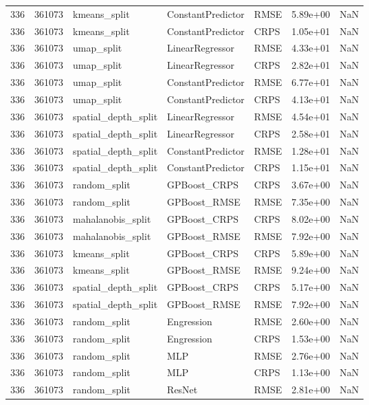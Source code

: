 \begin{tabular}{rrlllrr}
336 & 361073 & kmeans\_split & ConstantPredictor & RMSE & 5.89e+00 & NaN \\
336 & 361073 & kmeans\_split & ConstantPredictor & CRPS & 1.05e+01 & NaN \\
336 & 361073 & umap\_split & LinearRegressor & RMSE & 4.33e+01 & NaN \\
336 & 361073 & umap\_split & LinearRegressor & CRPS & 2.82e+01 & NaN \\
336 & 361073 & umap\_split & ConstantPredictor & RMSE & 6.77e+01 & NaN \\
336 & 361073 & umap\_split & ConstantPredictor & CRPS & 4.13e+01 & NaN \\
336 & 361073 & spatial\_depth\_split & LinearRegressor & RMSE & 4.54e+01 & NaN \\
336 & 361073 & spatial\_depth\_split & LinearRegressor & CRPS & 2.58e+01 & NaN \\
336 & 361073 & spatial\_depth\_split & ConstantPredictor & RMSE & 1.28e+01 & NaN \\
336 & 361073 & spatial\_depth\_split & ConstantPredictor & CRPS & 1.15e+01 & NaN \\
336 & 361073 & random\_split & GPBoost\_CRPS & CRPS & 3.67e+00 & NaN \\
336 & 361073 & random\_split & GPBoost\_RMSE & RMSE & 7.35e+00 & NaN \\
336 & 361073 & mahalanobis\_split & GPBoost\_CRPS & CRPS & 8.02e+00 & NaN \\
336 & 361073 & mahalanobis\_split & GPBoost\_RMSE & RMSE & 7.92e+00 & NaN \\
336 & 361073 & kmeans\_split & GPBoost\_CRPS & CRPS & 5.89e+00 & NaN \\
336 & 361073 & kmeans\_split & GPBoost\_RMSE & RMSE & 9.24e+00 & NaN \\
336 & 361073 & spatial\_depth\_split & GPBoost\_CRPS & CRPS & 5.17e+00 & NaN \\
336 & 361073 & spatial\_depth\_split & GPBoost\_RMSE & RMSE & 7.92e+00 & NaN \\
336 & 361073 & random\_split & Engression & RMSE & 2.60e+00 & NaN \\
336 & 361073 & random\_split & Engression & CRPS & 1.53e+00 & NaN \\
336 & 361073 & random\_split & MLP & RMSE & 2.76e+00 & NaN \\
336 & 361073 & random\_split & MLP & CRPS & 1.13e+00 & NaN \\
336 & 361073 & random\_split & ResNet & RMSE & 2.81e+00 & NaN \\

\end{tabular}
